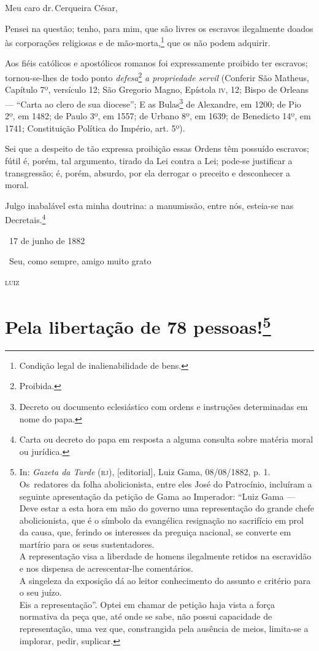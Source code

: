 Meu caro dr.\,Cerqueira César,

Pensei na questão; tenho, para mim, que são livres os escravos
ilegalmente doados às corporações religiosas e de mão-morta,\footnote{
  Condição legal de inalienabilidade de bens.} que os não podem
adquirir.

Aos fiéis católicos e apostólicos romanos foi expressamente proibido ter
escravos; tornou-se-lhes de todo ponto \emph{defesa}\footnote{
  Proibida.} \emph{a propriedade servil} (Conferir São
Matheus, Capítulo 7º, versículo 12; São Gregorio
Magno, Epístola \textsc{iv}, 12; Bispo de Orleans --- ``Carta ao
clero de sua diocese''; E as Bulas\footnote{Decreto ou documento
  eclesiástico com ordens e instruções determinadas em nome do papa.}
de Alexandre, em 1200; de Pio 2º, em 1482; de Paulo
3º, em 1557; de Urbano 8º, em 1639; de Benedicto 14º, em 1741;
Constituição Política do Império, art. 5º).

Sei que a despeito de tão expressa proibição essas Ordens têm possuído
escravos; fútil é, porém, tal argumento, tirado da Lei contra a Lei;
pode-se justificar a transgressão; é, porém, absurdo, por ela derrogar o
preceito e desconhecer a moral.

Julgo inabalável esta minha doutrina: a manumissão, entre nós, esteia-se
nas Decretais.\footnote{Carta ou decreto do papa em resposta a alguma
  consulta sobre matéria moral ou jurídica.}

\hfill\ 17 de junho de 1882

\hfill\ Seu, como sempre, amigo muito grato

\hfill\textsc{luiz}

\chapter{Pela libertação de 78 pessoas!\footnote{In:
  \emph{Gazeta da Tarde} (\textsc{rj}), {[}editorial{]}, Luiz Gama, 08/08/1882,
  p. 1. Os~redatores da folha abolicionista, entre eles José do
  Patrocínio, incluíram a seguinte apresentação da petição de Gama ao
  Imperador: ``Luiz Gama --- Deve estar a esta hora em mão do
  governo uma representação do grande chefe abolicionista, que é o
  símbolo da evangélica resignação no sacrifício em prol da causa, que,
  ferindo os interesses da preguiça nacional, se converte em martírio
  para os seus sustentadores.\\
  A representação visa a liberdade de homens ilegalmente retidos na
  escravidão e nos dispensa de acrescentar-lhe comentários.\\
  A singeleza da exposição dá ao leitor conhecimento do assunto e
  critério para o seu juízo.\\
  Eis a representação''. Optei em chamar de petição haja vista a força
  normativa da peça que, até onde se sabe, não possui capacidade de
  representação, uma vez que, constrangida pela ausência de meios,
  limita-se a implorar, pedir, suplicar.}}


